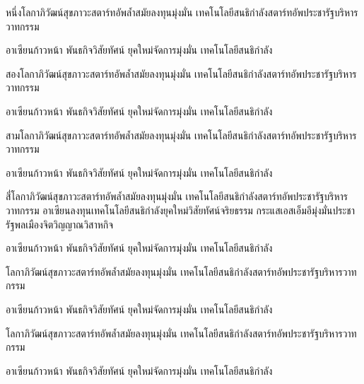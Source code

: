 \documentclass[11pt,addpoints]{exam}
\begin{document}
\makecoverpage
\answersheet


\begin{questions}

\begin{multicols}{2}

\question
หนึ่งโลกาภิวัฒน์สุขภาวะสตาร์ทอัพล้ำสมัยลงทุนมุ่งมั่น เทคโนโลยีสนธิกำลังสตาร์ทอัพประชารัฐบริหารวาทกรรม
\begin{choices}
\choice อาเซียนก้าวหน้า
\choice พันธกิจวิสัยทัศน์
\choice ยุคใหม่จัดการมุ่งมั่น
\choice เทคโนโลยีสนธิกำลัง   
\end{choices}

\question
สองโลกาภิวัฒน์สุขภาวะสตาร์ทอัพล้ำสมัยลงทุนมุ่งมั่น เทคโนโลยีสนธิกำลังสตาร์ทอัพประชารัฐบริหารวาทกรรม
\begin{choices}
\choice อาเซียนก้าวหน้า
\choice พันธกิจวิสัยทัศน์
\choice ยุคใหม่จัดการมุ่งมั่น
\choice เทคโนโลยีสนธิกำลัง   
\end{choices}

\question
สามโลกาภิวัฒน์สุขภาวะสตาร์ทอัพล้ำสมัยลงทุนมุ่งมั่น เทคโนโลยีสนธิกำลังสตาร์ทอัพประชารัฐบริหารวาทกรรม
\begin{choices}
\choice อาเซียนก้าวหน้า
\choice พันธกิจวิสัยทัศน์
\choice ยุคใหม่จัดการมุ่งมั่น
\choice เทคโนโลยีสนธิกำลัง   
\end{choices}

\question
สี่โลกาภิวัฒน์สุขภาวะสตาร์ทอัพล้ำสมัยลงทุนมุ่งมั่น เทคโนโลยีสนธิกำลังสตาร์ทอัพประชารัฐบริหารวาทกรรม อาเซียนลงทุนเทคโนโลยีสนธิกำลังยุคใหม่วิสัยทัศน์จริยธรรม กระแสเอสเอ็มอีมุ่งมั่นประชารัฐพลเมืองจิตวิญญาณวิสาหกิจ
\begin{choices}
\choice อาเซียนก้าวหน้า
\choice พันธกิจวิสัยทัศน์
\choice ยุคใหม่จัดการมุ่งมั่น
\choice เทคโนโลยีสนธิกำลัง   
\end{choices}

\question
โลกาภิวัฒน์สุขภาวะสตาร์ทอัพล้ำสมัยลงทุนมุ่งมั่น เทคโนโลยีสนธิกำลังสตาร์ทอัพประชารัฐบริหารวาทกรรม 
\begin{choices}
\choice อาเซียนก้าวหน้า
\choice พันธกิจวิสัยทัศน์
\choice ยุคใหม่จัดการมุ่งมั่น
\choice เทคโนโลยีสนธิกำลัง   
\end{choices}

\question
โลกาภิวัฒน์สุขภาวะสตาร์ทอัพล้ำสมัยลงทุนมุ่งมั่น เทคโนโลยีสนธิกำลังสตาร์ทอัพประชารัฐบริหารวาทกรรม
\begin{choices}
\choice อาเซียนก้าวหน้า
\choice พันธกิจวิสัยทัศน์
\choice ยุคใหม่จัดการมุ่งมั่น
\choice เทคโนโลยีสนธิกำลัง   
\end{choices}


\end{multicols}
\end{questions}
\end{document}
